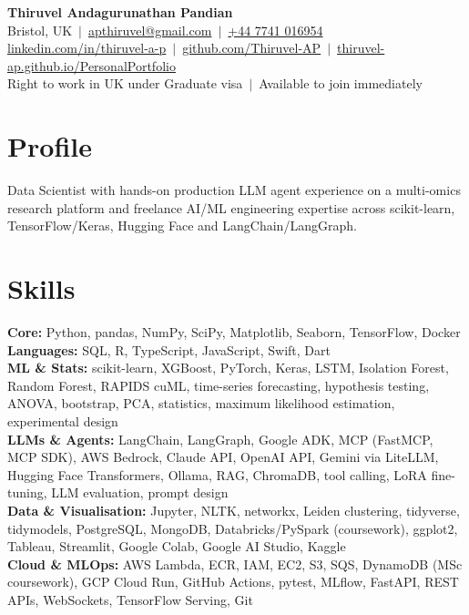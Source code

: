\documentclass[a4paper,11pt]{article}
\begin{document}
\fontsize{11}{13.2}\selectfont

\begin{center}
  {\LARGE\bfseries Thiruvel Andagurunathan Pandian}\\[3pt]
  Bristol, UK \,$|$\, \href{mailto:apthiruvel@gmail.com}{apthiruvel@gmail.com} \,$|$\, \href{tel:+447741016954}{+44 7741 016954}\\[1pt]
\href{https://www.linkedin.com/in/thiruvel-a-p/}{linkedin.com/in/thiruvel-a-p} \,$|$\, \href{https://github.com/Thiruvel-AP}{github.com/Thiruvel-AP} \,$|$\, \href{https://thiruvel-ap.github.io/PersonalPortfolio/}{thiruvel-ap.github.io/PersonalPortfolio}\\[1pt]
  Right to work in UK under Graduate visa \,$|$\, Available to join immediately
\end{center}

\section{Profile}
Data Scientist with hands-on production LLM agent experience on a multi-omics research platform and freelance AI/ML engineering expertise across scikit-learn, TensorFlow/Keras, Hugging Face and LangChain/LangGraph.

\section{Skills}
\textbf{Core:} Python, pandas, NumPy, SciPy, Matplotlib, Seaborn, TensorFlow, Docker\\[2pt]
\textbf{Languages:} SQL, R, TypeScript, JavaScript, Swift, Dart\\[2pt]
\textbf{ML \& Stats:} scikit-learn, XGBoost, PyTorch, Keras, LSTM, Isolation Forest, Random Forest, RAPIDS cuML, time-series forecasting, hypothesis testing, ANOVA, bootstrap, PCA, statistics, maximum likelihood estimation, experimental design\\[2pt]
\textbf{LLMs \& Agents:} LangChain, LangGraph, Google ADK, MCP (FastMCP, MCP SDK), AWS Bedrock, Claude API, OpenAI API, Gemini via LiteLLM, Hugging Face Transformers, Ollama, RAG, ChromaDB, tool calling, LoRA fine-tuning, LLM evaluation, prompt design\\[2pt]
\textbf{Data \& Visualisation:} Jupyter, NLTK, networkx, Leiden clustering, tidyverse, tidymodels, PostgreSQL, MongoDB, Databricks/PySpark (coursework), ggplot2, Tableau, Streamlit, Google Colab, Google AI Studio, Kaggle\\[2pt]
\textbf{Cloud \& MLOps:} AWS Lambda, ECR, IAM, EC2, S3, SQS, DynamoDB (MSc coursework), GCP Cloud Run, GitHub Actions, pytest, MLflow, FastAPI, REST APIs, WebSockets, TensorFlow Serving, Git
\end{document}
